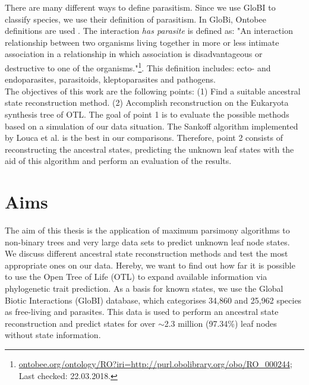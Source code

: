   There are many different ways to define parasitism. Since we use GloBI to classify species, we use 
    their definition of parasitism. In GloBi, Ontobee definitions are used \cite{Xiang2011}. The 
    interaction \textit{has parasite} is defined as: "An interaction relationship between two 
    organisms living together in more or less intimate association in a relationship in which 
    association is disadvantageous or destructive to one of the organisms."\footnote{
      \hyperlink{http://www.ontobee.org/ontology/RO?iri=http://purl.obolibrary.org/obo/RO_0002445}
      {ontobee.org/ontology/RO?iri=http://purl.obolibrary.org/obo/RO\_000244}; Last checked: 22.03.2018.
    }. This definition includes: ecto- and endoparasites, parasitoids, kleptoparasites and pathogens. \\


  The objectives of this work are the following points: (1) Find a suitable ancestral state 
    reconstruction method. (2) Accomplish reconstruction on the Eukaryota synthesis tree of OTL. The 
    goal of point 1 is to evaluate the possible methods based on a simulation of our data situation. 
    The Sankoff algorithm implemented by Louca et al. is the best in our comparisons. Therefore,
    point 2 consists of reconstructing the ancestral states, predicting the unknown leaf states with 
    the aid of this algorithm and perform an evaluation of the results.

\chapter{Aims}
  The aim of this thesis is the application of maximum parsimony algorithms to non-binary trees and 
    very large data sets to predict unknown leaf node states. \\
  We discuss different ancestral state reconstruction methods and test the most appropriate ones on 
    our data. Hereby, we want to find out how far it is possible to use the Open Tree of Life (OTL) 
    to expand available information via phylogenetic trait prediction. As a basis for known states, 
    we use the Global Biotic Interactions (GloBI) database, which categorises 34,860 and 25,962 
    species as free-living and parasites. This data is used to perform an ancestral state 
    reconstruction and predict states for over $\sim$2.3 million (97.34\%) leaf nodes without state 
    information.

